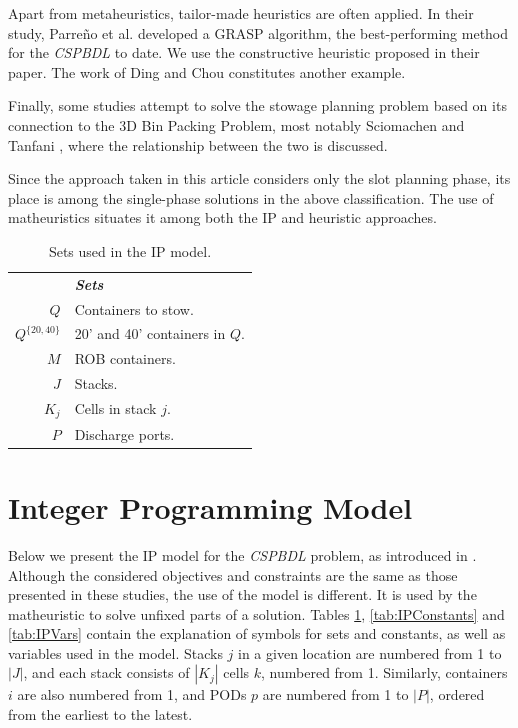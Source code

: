 \documentclass[preprint,11pt,3p]{elsarticle}
\begin{document}
Apart from metaheuristics, tailor-made heuristics are often applied. In their study, Parre\~{n}o et al. \cite{PPAV16} developed a GRASP algorithm, the best-performing method for the \textit{CSPBDL} to date. We use the constructive heuristic proposed in their paper. The work of Ding and Chou \cite{DC15} constitutes another example.

Finally, some studies attempt to solve the stowage planning problem based on its connection to the 3D Bin Packing Problem, most notably Sciomachen and Tanfani \cite{ST03}, where the relationship between the two is discussed.

Since the approach taken in this article considers only the slot planning phase, its place is among the single-phase solutions in the above classification. The use of matheuristics situates it among both the IP and heuristic approaches.

\begin{table} [ht]
\begin{tabular}{rl}
    & \textbf{\textit{Sets}}\\
    $Q$& Containers to stow.\\
    $Q^{\{20, 40\}}$& 20' and 40' containers in $Q$.\\
    $M$& ROB containers.\\
    $J$& Stacks.\\
    $K_j$& Cells in stack $j$.\\
    $P$& Discharge ports.
\end{tabular}
\caption{Sets used in the IP model.}
\label{tab:IPSets}
\end{table}

\section{Integer Programming Model}
\label{sec:Model}

Below we present the IP model for the \textit{CSPBDL} problem, as introduced in \cite{DJJRA12, DPhD}. Although the considered objectives and constraints are the same as those presented in these studies, the use of the model is different. It is used by the matheuristic to solve unfixed parts of a solution. Tables \ref{tab:IPSets}, \ref{tab:IPConstants} and \ref{tab:IPVars} contain the explanation of symbols for sets and constants, as well as variables used in the model. Stacks $j$ in a given location are numbered from 1 to $|J|$, and each stack consists of $|K_j|$ cells $k$, numbered from 1. Similarly, containers $i$ are also numbered from 1, and PODs $p$ are numbered from 1 to $|P|$, ordered from the earliest to the latest.
\end{document}
